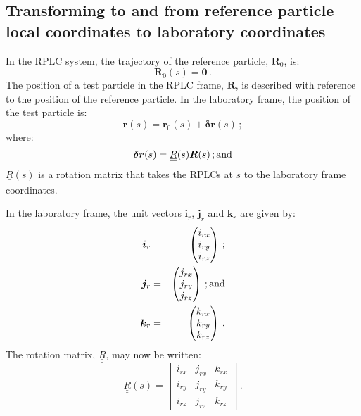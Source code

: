 \subsection{Transforming to and from reference particle local
            coordinates to laboratory coordinates}
            
In the RPLC system, the trajectory of the reference particle,
$\bm{R}_0$, is:
\begin{equation}
  \bm{R}_0(s) = \bm{0}\,.
\end{equation}
The position of a test particle in the RPLC frame, $\bm{R}$, is
described with reference to the position of the reference particle.
In the laboratory frame, the position of the test particle is:
\begin{equation}
  \bm{r}(s) = \bm{r}_0(s) + \bm{\delta r}(s) \,;
\end{equation}
where:
\begin{equation}
  \bm{\delta r}(s) = \underline{\underline{R}}(s) \bm{R}(s) \,{\rm ; and}
\end{equation}
$\underline{\underline{R}}(s)$ is a rotation matrix that takes
the RPLCs at $s$ to the laboratory frame coordinates.

In the laboratory frame, the unit vectors $\bm{i}_r$,
$\bm{j}_r$ and $\bm{k}_r$ are given by:
\begin{eqnarray}
  \bm{i}_r & = & \begin{pmatrix} i_{rx} \\ i_{ry} \\  i_{rz} \\ \end{pmatrix} \,;           \nonumber \\
  \bm{j}_r & = & \begin{pmatrix} j_{rx} \\ j_{ry} \\  j_{rz} \\ \end{pmatrix} \,{\rm ; and}           \\
  \bm{k}_r & = & \begin{pmatrix} k_{rx} \\ k_{ry} \\  k_{rz} \\ \end{pmatrix} \,.           \nonumber
\end{eqnarray}
The rotation matrix, $\underline{\underline{R}}$, may now be written:
\begin{equation}
  \underline{\underline{R}}(s) =
    \begin{bmatrix}
      i_{rx} & j_{rx} & k_{rx} \\
      i_{ry} & j_{ry} & k_{ry} \\
      i_{rz} & j_{rz} & k_{rz}
    \end{bmatrix} \,.
\end{equation}
